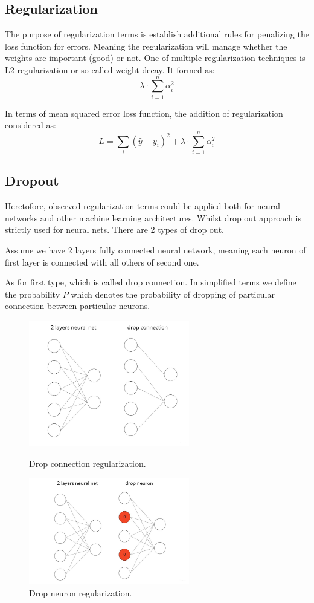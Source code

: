 \subsection{Regularization}
The purpose of regularization terms is establish additional rules for penalizing the loss function for errors. Meaning the regularization will manage whether the weights are important (good) or not. One of multiple regularization techniques is L2 regularization or so called weight decay. It formed as:
\[ \lambda \cdot \sum_{i=1}^{n} \alpha_i^2 \]

In terms of mean squared error loss function, the addition of regularization considered as:
\[ L = \sum_{i}(\hat{y}-y_i)^2 + \lambda \cdot \sum_{i=1}^{n} \alpha_i^2\]

\subsection{Dropout}
Heretofore, observed regularization terms could be applied both for neural networks and other machine learning architectures. Whilst drop out approach is strictly used for neural nets. There are 2 types of drop out. 

Assume we have 2 layers fully connected neural network, meaning each neuron of first layer is connected with all others of second one. 

As for first type, which is called drop connection. In simplified terms we define the probability $P$ which denotes the probability of dropping of particular connection between particular neurons.  

\begin{figure}[H]
\centering
\begin{minipage}{.48\linewidth}
    \includegraphics[width=7cm]{images/drop_connection.jpg}
    \caption {Drop connection regularization.}
    \label{fig:drop_connection}
\end{minipage}
\hfill
\begin{minipage}{.48\linewidth}
    \includegraphics[width=7cm]{images/drop_neuron.jpg}
    \caption {Drop neuron regularization.}
    \label{fig:drop_neuron}
\end{minipage}
\end{figure}

